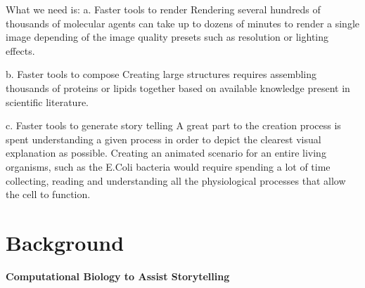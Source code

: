 What we need is:
a. Faster tools to render
	Rendering several hundreds of thousands of molecular agents can take up to dozens of minutes to render a single image depending of the image quality presets such as resolution or lighting effects.

b. Faster tools to compose
	Creating large structures requires assembling thousands of proteins or lipids together based on available knowledge present in scientific literature.

c. Faster tools to generate story telling
	A great part to the creation process is spent understanding a given process in order to depict the clearest visual explanation as possible.
	Creating an animated scenario for an entire living organisms, such as the E.Coli bacteria would require spending a lot of time collecting, reading and understanding all the physiological processes that allow the cell to function.


\section{Background}

\textbf{Computational Biology to Assist Storytelling}

%
%

